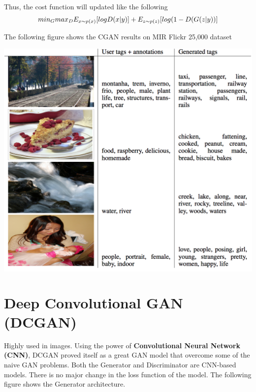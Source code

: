 \documentclass{winnower}
\begin{document}
Thus, the cost function will updated like the following
\[min_G \\ max_D \\ E_{x\sim p(x)} [log D(x|y)] + E_{z\sim p(z)} [log(1 - D(G(z|y))]\]

The following figure shows the CGAN results on MIR Flickr 25,000 dataset

\begin{center}
\includegraphics{flicker.png}
\end{center}

\section{Deep Convolutional GAN (DCGAN)}
Highly used in images. Using the power of \textbf{Convolutional Neural Network (CNN)}, DCGAN proved itself as a great GAN model that overcome some of the naive GAN problems. Both the Generator and Discriminator are CNN-based models. There is no major change in the loss function of the model. The following figure shows the Generator architecture. 
\end{document}
